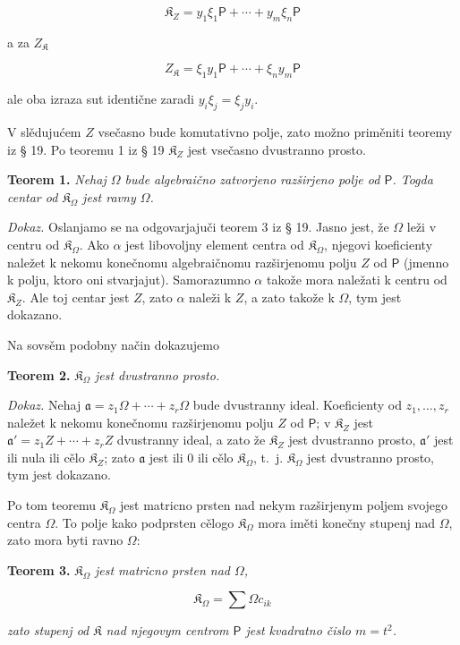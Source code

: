\documentclass[11pt]{article}
\begin{document}
\[
\mathfrak K_Z=y_1\xi_1\mathsf P+\cdots+y_m\xi_n\mathsf P
\]

a za \(Z_{\mathfrak K}\)

\[
Z_{\mathfrak K}=\xi_1y_1\mathsf P+\cdots+\xi_ny_m\mathsf P
\]

ale oba izraza sut identične zaradi \(y_i\xi_j=\xi_jy_i\).

V slědujućem \(Z\) vsečasno bude komutativno polje, zato možno priměniti teoremy iz § 19. Po teoremu 1 iz § 19 \(\mathfrak K_Z\) jest vsečasno dvustranno prosto.

\textbf{Teorem 1.} \emph{Nehaj \(\Omega\) bude algebraično zatvorjeno razširjeno polje od \(\mathsf P\). Togda centar od \(\mathfrak K_\Omega\) jest ravny \(\Omega\).}

\emph{Dokaz.} Oslanjamo se na odgovarjajuči teorem 3 iz § 19. Jasno jest, že \(\Omega\) leži v centru od \(\mathfrak K_\Omega\). Ako \(\alpha\) jest libovoljny element centra od \(\mathfrak K_\Omega\), njegovi koeficienty naležet k nekomu konečnomu algebraičnomu razširjenomu polju \(Z\) od \(\mathsf P\) (jmenno k polju, ktoro oni stvarjajut). Samorazumno \(\alpha\) takože mora naležati k centru od \(\mathfrak K_Z\). Ale toj centar jest \(Z\), zato \(\alpha\) naleži k \(Z\), a zato takože k \(\Omega\), tym jest dokazano.

Na sovsěm podobny način dokazujemo

\textbf{Teorem 2.} \emph{\(\mathfrak K_\Omega\) jest dvustranno prosto.}

\emph{Dokaz.} Nehaj \(\mathfrak a=z_1\Omega+\cdots+z_r\Omega\) bude dvustranny ideal. Koeficienty od \(z_1,\ldots,z_r\) naležet k nekomu konečnomu razširjenomu polju \(Z\) od \(\mathsf P\); v \(\mathfrak K_Z\) jest \(\mathfrak a'=z_1Z+\cdots+z_rZ\) dvustranny ideal, a zato že \(\mathfrak K_Z\) jest dvustranno prosto, \(\mathfrak a'\) jest ili nula ili cělo \(\mathfrak K_Z\); zato \(\mathfrak a\) jest ili 0 ili cělo \(\mathfrak K_\Omega\), t.~j. \(\mathfrak K_\Omega\) jest dvustranno prosto, tym jest dokazano.

Po tom teoremu \(\mathfrak K_\Omega\) jest matricno prsten nad nekym razširjenym poljem svojego centra \(\Omega\). To polje kako podprsten cělogo \(\mathfrak K_\Omega\) mora iměti konečny stupenj nad \(\Omega\), zato mora byti ravno \(\Omega\):

\textbf{Teorem 3.} \emph{\(\mathfrak K_\Omega\) jest matricno prsten nad \(\Omega\),}

\[
\mathfrak K_\Omega=\sum\Omega c_{ik}
\]

\emph{zato stupenj od \(\mathfrak K\) nad njegovym centrom \(\mathsf P\) jest kvadratno čislo \(m=t^2\).}
\end{document}
